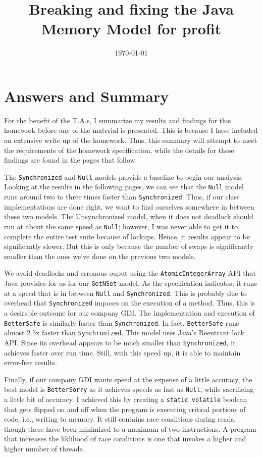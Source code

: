 \documentclass[11pt]{article}
\author{}
\date{\today}
\title{Breaking and fixing the Java Memory Model for profit}
\begin{document}
\maketitle
\tableofcontents


\section{Answers and Summary}
\label{sec-1}
For the benefit of the T.A.s, I summarize my results and
findings for this homework before any of the material is
presented. This is because I have included an extensive
write up of the homework. Thus, this summary will attempt
to meet the requirements of the homework specification,
while the details for these findings are found in the
pages that follow.

The \verb~Synchronized~ and \verb~Null~ models provide a baseline
to begin our analysis. Looking at the results in the
following pages, we can see that the \verb~Null~ model runs
around two to three times faster than \verb~Synchronized~.
Thus, if our class implementations are done right, we
want to find ourselves somewhere in between these two
models. The Unsynchronized model, when it does not deadlock
should run at about the same speed as \verb~Null~; however,
I was never able to get it to complete the entire test
suite because of lockups. Hence, it results appear to
be significantly slower. But this is only because the
number of swaps is significantly smaller than the ones
we've done on the previous two models.

We avoid deadlocks and erronous ouput using the \verb~AtomicIntegerArray~
API that Java provides for us for our \verb~GetNSet~ model.  As the
specification indicates, it runs at a speed that is in between \verb~Null~
and \verb~Synchronized~. This is probably due to overhead that
\verb~Synchronized~ imposes on the execution of a method. Thus, this is a
desirable outcome for our company GDI. The implementation and
execution of \verb~BetterSafe~ is similarly faster than \verb~Synchronized~.
In fact, \verb~BetterSafe~ runs almost 2.5x faster than \verb~Synchronized~.
This model uses Java's Reentrant lock API. Since its overhead appears
to be much smaller than \verb~Synchronized~, it achieves faster over
run time. Still, with this speed up, it is able to maintain 
error-free results.

Finally, if our company GDI wants speed at the expense of a little
accuracy, the best model is \verb~BetterSorry~ as it achieves speeds
as fast as \verb~Null~, while sacrificing a little bit of accuracy.
I achieved this by creating a \verb~static volatile~ boolean that gets
flipped on and off when the program is executing critical portions
of code, i.e., writing to memory. It still contains race conditions
during reads, though these have been minimized to a maximum of two
instructions. A program that increases the liklihood of race conditions
is one that invokes a higher and higher number of threads.
\end{document}
